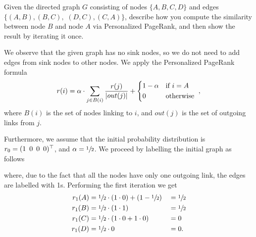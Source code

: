 \exercise

Given the directed graph $G$ consisting of nodes $\{A, B, C, D\}$ and edges 
$\{(A,B), (B,C),$ $ (D,C), (C,A)\}$, describe how you compute the similarity
between node $B$ and node $A$ via Personalized PageRank, and then show the
result by iterating it once.

\solution

We observe that the given graph has no sink nodes, so we do not need to add
edges from sink nodes to other nodes. We apply the Personalized PageRank formula
%
\begin{equation*}
  r(i) = \alpha\cdot\sum_{j\in B(i)} \frac{r(j)}{|out(j)|} +
  \begin{cases*}
    1-\alpha & if $i=A$ \\
    0        & otherwise
  \end{cases*},
\end{equation*}
%
where $B(i)$ is the set of nodes linking to $i$, and $out(j)$ is the set of
outgoing links from $j$.

Furthermore, we assume that the initial probability distribution is
$r_0=(1 \enskip 0 \enskip 0 \enskip 0)^\top$, and $\alpha=\sfrac{1}{2}$. We
proceed by labelling the initial graph as follows
%
\begin{center}
\end{center}
%
where, due to the fact that all the nodes have only one outgoing link, the edges
are labelled with 1s. Performing the first iteration we get
%
\begin{alignat*}{3}
  r_1(A) &= \sfrac{1}{2} \cdot (1\cdot0) + (1-\sfrac{1}{2}) &&= \sfrac{1}{2} \\
  r_1(B) &= \sfrac{1}{2} \cdot (1\cdot1)                    &&= \sfrac{1}{2} \\
  r_1(C) &= \sfrac{1}{2} \cdot (1\cdot0+1\cdot0)            && = 0 \\
  r_1(D) &= \sfrac{1}{2} \cdot 0                            &&= 0.
\end{alignat*}

